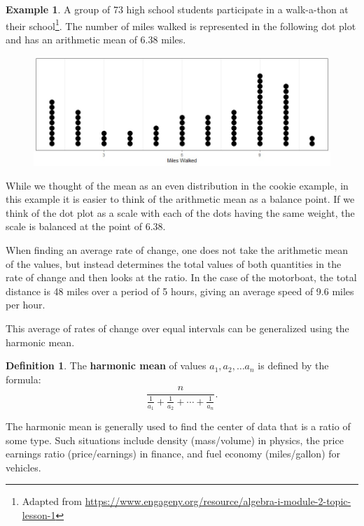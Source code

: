 \documentclass[
]{book}
\theoremstyle{definition}
\newtheorem{definition}{Definition}[chapter]
\theoremstyle{definition}
\newtheorem{example}{Example}[chapter]
\theoremstyle{definition}
\theoremstyle{definition}
\theoremstyle{remark}
\begin{document}
\begin{example}

A group of 73 high school students participate in a walk-a-thon at their school\footnote{Adapted from \url{https://www.engageny.org/resource/algebra-i-module-2-topic-lesson-1}}. The number of miles walked is represented in the following dot plot and has an arithmetic mean of 6.38 miles.

\begin{figure}

{\centering \includegraphics[width=0.8\linewidth]{images/walkathon_dotplot} 

}

\end{figure}

While we thought of the mean as an even distribution in the cookie example, in this example it is easier to think of the arithmetic mean as a balance point. If we think of the dot plot as a scale with each of the dots having the same weight, the scale is balanced at the point of 6.38.

\end{example}

When finding an average rate of change, one does not take the arithmetic mean of the values, but instead determines the total values of both quantities in the rate of change and then looks at the ratio. In the case of the motorboat, the total distance is 48 miles over a period of 5 hours, giving an average speed of 9.6 miles per hour.

This average of rates of change over equal intervals can be generalized using the harmonic mean.

\begin{definition}
The \textbf{harmonic mean} of values \(a_1, a_2, \ldots a_n\) is defined by the formula:
\[\frac{n}{\frac{1}{a_1} + \frac{1}{a_2} + \cdots + \frac{1}{a_n}}.\]
\end{definition}

The harmonic mean is generally used to find the center of data that is a ratio of some type. Such situations include density (mass/volume) in physics, the price earnings ratio (price/earnings) in finance, and fuel economy (miles/gallon) for vehicles.
\end{document}
